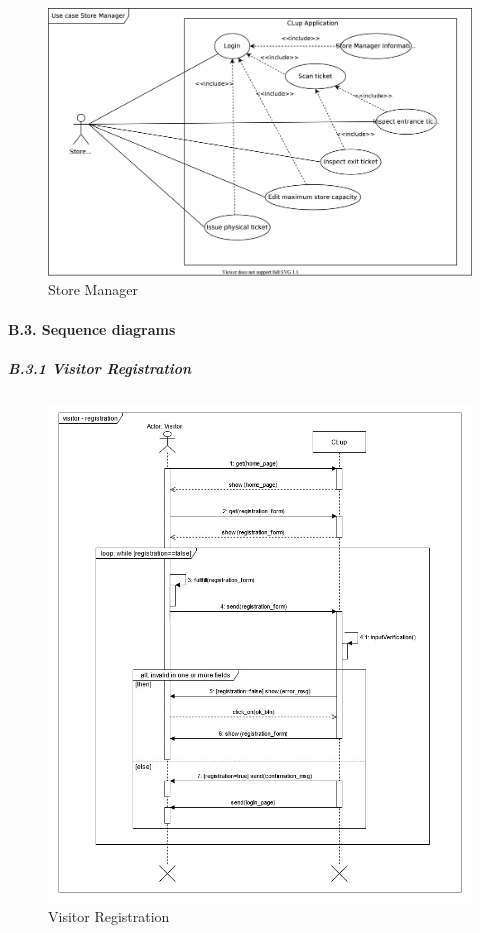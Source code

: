 \documentclass[
]{article}
\begin{document}
\begin{figure}
\centering
\includegraphics{assets/rasd/use_cases/use_case_store_manager.jpg}
\caption{Store Manager}
\end{figure}

\hypertarget{b.3.-sequence-diagrams}{%
\paragraph{B.3. Sequence diagrams}\label{b.3.-sequence-diagrams}}

\hypertarget{b.3.1-visitor-registration}{%
\subparagraph{\texorpdfstring{B.3.1 Visitor Registration
}{B.3.1 Visitor Registration }}\label{b.3.1-visitor-registration}}

\begin{figure}
\centering
\includegraphics{assets/rasd/sequence_diagrams/sequence_diagram_visitor_registration.jpg}
\caption{Visitor Registration}
\end{figure}
\end{document}
